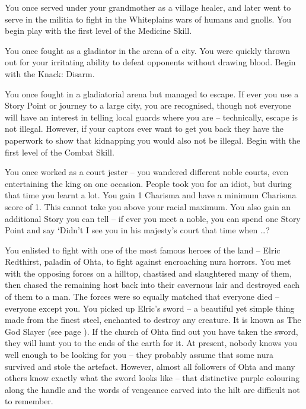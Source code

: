 \begin{multicols}{2}
\begin{list}{\addtocounter{list}{1}\textbf{:}}{\raggedleft}
\item{ You once served under your grandmother as a village healer, and later went to serve in the militia to fight in the Whiteplains wars of humans and gnolls.
You begin play with the first level of the Medicine Skill. }

\item{ You once fought as a gladiator in the arena of a city.  You were quickly thrown out for your irritating ability to defeat opponents without drawing blood.  Begin with the Knack: Disarm. }

\item{You once fought in a gladiatorial arena but managed to escape.
If ever you use a Story Point or journey to a large city, you are recognised, though not everyone will have an interest in telling local guards where you are -- technically, escape is not illegal.
However, if your captors ever want to get you back they have the paperwork to show that kidnapping you would also not be illegal.
Begin with the first level of the Combat Skill. }

\item{You once worked as a court jester -- you wandered different noble courts, even entertaining the king on one occasion.
	People took you for an idiot, but during that time you learnt a lot.
	You gain 1 Charisma and have a minimum Charisma score of 1.
	This cannot take you above your racial maximum.
	You also gain an additional Story you can tell -- if ever you meet a noble, you can spend one Story Point and say `Didn't I see you in his majesty's court that time when \ldots ?}

\item{You enlisted to fight with one of the most famous heroes of the land -- Elric Redthirst, paladin of Ohta, to fight against encroaching nura horrors.
You met with the opposing forces on a hilltop, chastised and slaughtered many of them, then chased the remaining host back into their cavernous lair and destroyed each of them to a man.
The forces were so equally matched that everyone died -- everyone except you.
You picked up Elric's sword -- a beautiful yet simple thing made from the finest steel, enchanted to destroy any creature.
It is known as The God Slayer (see page \pageref{godslayer}).
If the church of Ohta find out you have taken the sword, they will hunt you to the ends of the earth for it.
At present, nobody knows you well enough to be looking for you -- they probably assume that some nura survived and stole the artefact.
However, almost all followers of Ohta and many others know exactly what the sword looks like -- that distinctive purple colouring along the handle and the words of vengeance carved into the hilt are difficult not to remember.
}


\end{list}
\end{multicols}

